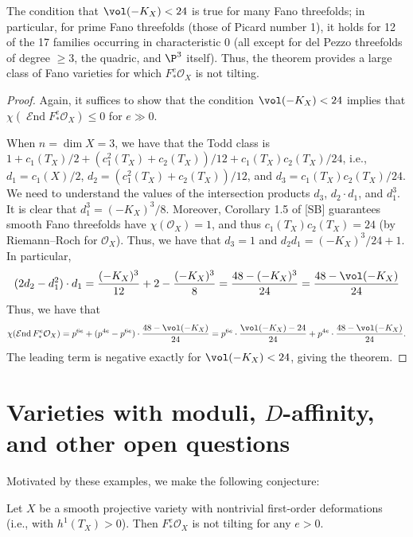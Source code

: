\documentclass{article}
\def\O{\mathcal O}
\numberwithin{equation}{section}
\theoremstyle{theorem}
\numberwithin{thm}{section}
\theoremstyle{definition}
\DeclareMathOperator{\SEnd}{\mathcal{E}nd}
\begin{document}
\begin{rem}
The condition that $\vol(-K_X)< 24$ is true for many Fano threefolds; in particular, for prime Fano threefolds (those of Picard number 1), it holds for 12 of the 17 families occurring in characteristic 0 (all except for del Pezzo threefolds of degree $\geq 3$, the quadric, and $\P^3$ itself). Thus, the theorem provides a large class of Fano varieties for which $F_*^e\O_X$ is not tilting.
\end{rem}


\begin{proof}
Again, it suffices to show that the condition $\vol(-K_X)< 24$ implies that $\chi(\SEnd F_*^e\O_X)\leq 0$ for $e\gg0$.

When $n=\dim X=3$, we have that the Todd class is $1+c_1(T_X)/2+(c_1^2(T_X)+c_2(T_X))/12+c_1(T_X)c_2(T_X)/24$, i.e., $d_1=c_1(X)/2$, $d_2=(c_1^2(T_X)+c_2(T_X))/12$, and $d_3=c_1(T_X)c_2(T_X)/24$.
We need to understand the values of the intersection products $d_3$, $d_2\cdot d_1$, and $d_1^3$. It is clear that $d_1^3 = (-K_X)^3/8$.
Moreover,
Corollary 1.5 of [SB] guarantees smooth Fano threefolds have $\chi(\O_X)=1$, and thus
 $c_1(T_X)c_2(T_X)=24$ (by Riemann--Roch for $\O_X$).
Thus, we have that $d_3=1$ and $d_2d_1=(-K_X)^3/24+1$.
In particular,
$$(2d_2-d_1^2 )\cdot d_1 = \frac{(-K_X)^3}{12}+2-\frac{(-K_X)^3}{8}
=\frac{48-(-K_X)^3}{24}
=\frac{48-\vol(-K_X)}{24}
 $$
Thus, we have that
$$
\chi(\SEnd F_*^e\O_X) 
\let\bigg\Big
=
p^{6e}+ 
(p^{4e}-p^{6e})\cdot 
\frac{48-\vol(-K_X)}{24}
=
p^{6e}\cdot \frac{\vol(-K_X)-24}{24}
+
p^{4e}\cdot \frac{48-\vol(-K_X)}{24}.
$$
The leading term is negative exactly for $\vol(-K_X)< 24$, giving the theorem.
\end{proof}


\section{Varieties with moduli, $D$-affinity, and other open questions}
\label{moduli}

Motivated by these examples, we make the following conjecture:

\begin{conj}
\label{conj1}
Let $X$ be a smooth projective variety with nontrivial first-order deformations (i.e., with $h^1(T_X)>0$). Then $F_*^e\O_X$ is not tilting for any $e>0$.
\end{conj}
\end{document}
